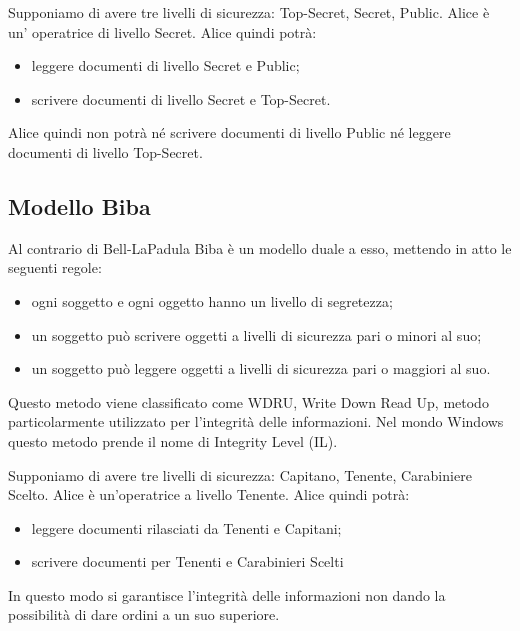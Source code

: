 Supponiamo di avere tre livelli di sicurezza: Top-Secret, Secret, Public.
Alice è un' operatrice di livello Secret. Alice quindi potrà:
\begin{itemize}
    \item leggere documenti di livello Secret e Public;
    \item scrivere documenti di livello Secret e Top-Secret.
\end{itemize}
Alice quindi non potrà né scrivere documenti di livello Public né leggere documenti di livello Top-Secret.

\subsection{Modello Biba}
Al contrario di Bell-LaPadula Biba è un modello duale a esso, mettendo in atto le seguenti regole:
\begin{itemize}
    \item ogni soggetto e ogni oggetto hanno un livello di segretezza;
    \item un soggetto può scrivere oggetti a livelli di sicurezza pari o minori al suo;
    \item un soggetto può leggere oggetti a livelli di sicurezza pari o maggiori al suo.
\end{itemize}
Questo metodo viene classificato come WDRU, Write Down Read Up, metodo particolarmente utilizzato per l'integrità delle informazioni. Nel mondo Windows questo metodo prende il nome di Integrity Level (IL).

Supponiamo di avere tre livelli di sicurezza: Capitano, Tenente, Carabiniere Scelto.
Alice è un'operatrice a livello Tenente. Alice quindi potrà:
\begin{itemize}
    \item leggere documenti rilasciati da Tenenti e Capitani;
    \item scrivere documenti per Tenenti e Carabinieri Scelti
\end{itemize}
In questo modo si garantisce l'integrità delle informazioni non dando la possibilità di dare ordini a un suo superiore.
